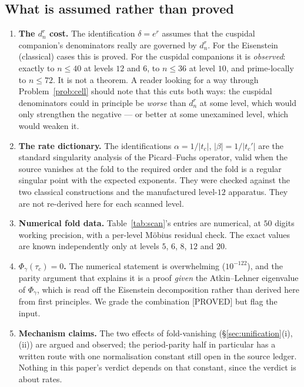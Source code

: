 \documentclass[11pt,reqno]{amsart}
\theoremstyle{plain}
\theoremstyle{definition}
\theoremstyle{remark}
\newcommand{\dn}{d_n}
\newcommand{\tc}{t_c}
\newcommand{\tcp}{t_c'}
\newcommand{\Proved}{\textup{\textsf{[PROVED]}}}
\begin{document}
\subsection{What is assumed rather than proved}

\begin{enumerate}[label=(A\arabic*),leftmargin=3em]
\item \textbf{The $\dn^r$ cost.} The identification $\delta=e^r$ assumes
  that the cuspidal companion's denominators really are governed by
  $\dn^r$. For the Eisenstein (classical) cases this is proved. For the
  cuspidal companions it is \emph{observed}: exactly to $n\le40$ at
  levels $12$ and $6$, to $n\le36$ at level $10$, and prime-locally to
  $n\le72$. It is not a theorem. A reader looking for a way through
  Problem~\ref{prob:cell} should note that this cuts both ways: the
  cuspidal denominators could in principle be \emph{worse} than $\dn^r$
  at some level, which would only strengthen the negative --- or better at
  some unexamined level, which would weaken it.
\item \textbf{The rate dictionary.} The identifications
  $\alpha=1/|\tc|$, $|\beta|=1/|\tcp|$ are the standard singularity
  analysis of the Picard--Fuchs operator, valid when the source vanishes
  at the fold to the required order and the fold is a regular singular
  point with the expected exponents. They were checked against the two
  classical constructions and the manufactured level-$12$ apparatus. They
  are not re-derived here for each scanned level.
\item \textbf{Numerical fold data.} Table~\ref{tab:scan}'s entries are
  numerical, at $50$ digits working precision, with a per-level M\"obius
  residual check. The exact values are known independently only at levels
  $5$, $6$, $8$, $12$ and $20$.
\item \textbf{$\Phi_\gamma(\tau_c)=0$.} The numerical statement is
  overwhelming ($10^{-122}$), and the parity argument that explains it is
  a proof \emph{given} the Atkin--Lehner eigenvalue of $\Phi_\gamma$,
  which is read off the Eisenstein decomposition rather than derived here
  from first principles. We grade the combination \Proved{} but flag the
  input.
\item \textbf{Mechanism claims.} The two effects of fold-vanishing
  (\S\ref{sec:unification}(i),(ii)) are argued and observed; the
  period-parity half in particular has a written route with one
  normalisation constant still open in the source ledger. Nothing in this
  paper's verdict depends on that constant, since the verdict is about
  rates.
\end{enumerate}
\end{document}
